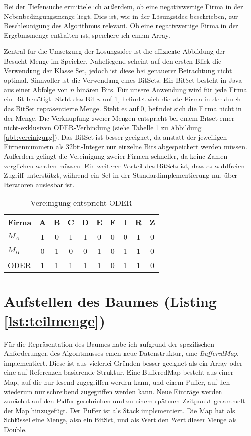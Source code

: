 Bei der Tiefensuche ermittele ich außerdem, ob eine negativwertige Firma in der Nebenbedingungsmenge liegt. Dies ist, wie in der Lösungsidee beschrieben, zur Beschleunigung des Algorithmus relevant. Ob eine negativwertige Firma in der Ergebnismenge enthalten ist, speichere ich einem Array.

Zentral für die Umsetzung der Lösungsidee ist die effiziente Abbildung der Besucht-Menge im Speicher. Naheliegend scheint auf den ersten Blick die Verwendung der Klasse Set, jedoch ist diese bei genauerer Betrachtung nicht optimal. Sinnvoller ist die Verwendung eines BitSets. Ein BitSet besteht in Java aus einer Abfolge von \(n\) binären Bits. Für unsere Anwendung wird für jede Firma ein Bit benötigt.
Steht das Bit \textit{n} auf 1, befindet sich die \textit{n}te Firma in der durch das BitSet repräsentierte Menge. Steht es auf 0, befindet sich die Firma nicht in der Menge.
Die Verknüpfung zweier Mengen entspricht bei einem Bitset einer nicht-exklusiven ODER-Verbindung (siehe Tabelle \ref{tab:veroder} zu Abbildung \ref{abb:vereinigung}).
Das BitSet ist besser geeignet, da anstatt der jeweiligen Firmennummern als 32bit-Integer nur einzelne Bits abgespeichert werden müssen. Außerdem gelingt die Vereinigung zweier Firmen schneller, da keine Zahlen verglichen werden müssen. Ein weiterer Vorteil des BitSets ist, dass es wahlfreien Zugriff unterstützt, während ein Set in der Standardimplementierung nur über Iteratoren auslesbar ist.
\begin{table}
	\centering
    \begin{tabular}{l|ccccccccc}
    Firma 	& A & B & C & D & E & F & I & R & Z \\ \hline
    \(M_A\)	& 1 & 0 & 1 & 1 & 0 & 0 & 0 & 1 & 0 \\
    \(M_B\)	& 0 & 1 & 0 & 0 & 1 & 0 & 1 & 1 & 0 \\ \hhline{=|*{9}{=}}
    ODER 	& 1 & 1 & 1 & 1 & 1 & 0 & 1 & 1 & 0 \\
    \end{tabular}
    \caption {Vereinigung entspricht ODER}
    \label{tab:veroder}
\end{table}

\section{Aufstellen des Baumes (Listing \ref{lst:teilmenge})}
Für die Repräsentation des Baumes habe ich aufgrund der spezifischen Anforderungen des Algoritmusses einen neue Datenstruktur, eine \textit{BufferedMap}, implementiert. Diese ist aus vielerlei Gründen besser geeignet als ein Array oder eine auf Referenzen basierende Struktur.
Eine BufferedMap besteht aus einer Map, auf die nur lesend zugegriffen werden kann, und einem Puffer, auf den wiederum nur schreibend zugegriffen werden kann. Neue Einträge werden zunächst auf den Puffer geschrieben und zu einem späteren Zeitpunkt gesammelt der Map hinzugefügt. Der Puffer ist als Stack implementiert. Die Map hat als Schlüssel eine Menge, also ein BitSet, und als Wert den Wert dieser Menge als Double.

